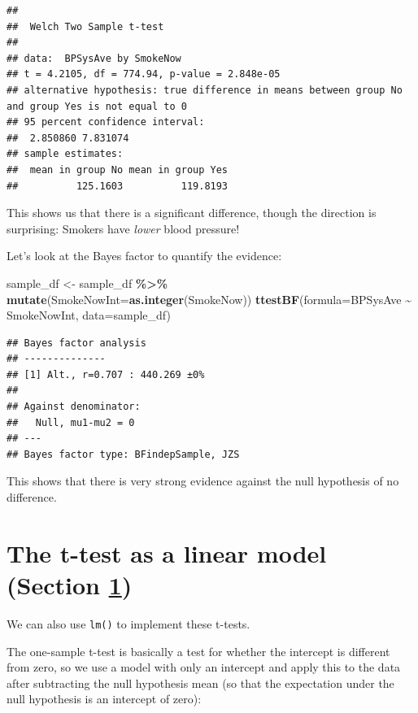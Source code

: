 \documentclass[
  12pt,
]{book}
\newenvironment{Shaded}{\begin{snugshade}}{\end{snugshade}}
\newcommand{\AttributeTok}[1]{\textcolor[rgb]{0.13,0.29,0.53}{#1}}
\newcommand{\FunctionTok}[1]{\textcolor[rgb]{0.13,0.29,0.53}{\textbf{#1}}}
\newcommand{\NormalTok}[1]{#1}
\newcommand{\OtherTok}[1]{\textcolor[rgb]{0.56,0.35,0.01}{#1}}
\newcommand{\SpecialCharTok}[1]{\textcolor[rgb]{0.81,0.36,0.00}{\textbf{#1}}}
\begin{document}
\begin{verbatim}
## 
##  Welch Two Sample t-test
## 
## data:  BPSysAve by SmokeNow
## t = 4.2105, df = 774.94, p-value = 2.848e-05
## alternative hypothesis: true difference in means between group No and group Yes is not equal to 0
## 95 percent confidence interval:
##  2.850860 7.831074
## sample estimates:
##  mean in group No mean in group Yes 
##          125.1603          119.8193
\end{verbatim}

This shows us that there is a significant difference, though the direction is surprising: Smokers have \emph{lower} blood pressure!

Let's look at the Bayes factor to quantify the evidence:

\begin{Shaded}
\begin{Highlighting}[]
\NormalTok{sample\_df }\OtherTok{\textless{}{-}}\NormalTok{ sample\_df }\SpecialCharTok{\%\textgreater{}\%}
  \FunctionTok{mutate}\NormalTok{(}\AttributeTok{SmokeNowInt=}\FunctionTok{as.integer}\NormalTok{(SmokeNow))}
\FunctionTok{ttestBF}\NormalTok{(}\AttributeTok{formula=}\NormalTok{BPSysAve }\SpecialCharTok{\textasciitilde{}}\NormalTok{ SmokeNowInt, }
        \AttributeTok{data=}\NormalTok{sample\_df)}
\end{Highlighting}
\end{Shaded}

\begin{verbatim}
## Bayes factor analysis
## --------------
## [1] Alt., r=0.707 : 440.269 ±0%
## 
## Against denominator:
##   Null, mu1-mu2 = 0 
## ---
## Bayes factor type: BFindepSample, JZS
\end{verbatim}

This shows that there is very strong evidence against the null hypothesis of no difference.

\hypertarget{ttest-linear-model}{%
\section{The t-test as a linear model (Section \ref{ttest-linear-model})}\label{ttest-linear-model}}

We can also use \texttt{lm()} to implement these t-tests.

The one-sample t-test is basically a test for whether the intercept is different from zero, so we use a model with only an intercept and apply this to the data after subtracting the null hypothesis mean (so that the expectation under the null hypothesis is an intercept of zero):
\end{document}

